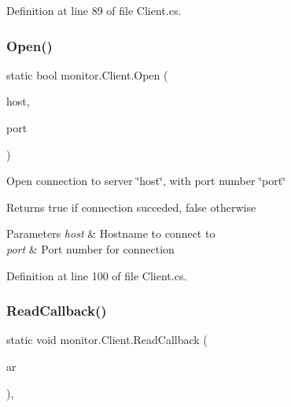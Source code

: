 Definition at line 89 of file Client.\+cs.

\mbox{\label{classmonitor_1_1_client_aee6f8f594a9496600b78c37d6da457d4}} 
\subsubsection{Open()\hspace{0.1cm}{\footnotesize\ttfamily [2/2]}}
{\footnotesize\ttfamily static bool monitor.\+Client.\+Open (\begin{DoxyParamCaption}\item[{string}]{host,  }\item[{int}]{port }\end{DoxyParamCaption})\hspace{0.3cm}{\ttfamily [static]}}



Open connection to server \char`\"{}host\char`\"{}, with port number \char`\"{}port\char`\"{} 

\begin{DoxyReturn}{Returns}
true if connection succeded, false otherwise
\end{DoxyReturn}

\begin{DoxyParams}{Parameters}
{\em host} & Hostname to connect to\\
\hline
{\em port} & Port number for connection\\
\hline
\end{DoxyParams}


Definition at line 100 of file Client.\+cs.

\mbox{\label{classmonitor_1_1_client_a8dd2eb26c164d0f566dd6c679ba340e0}} 
\subsubsection{Read\+Callback()}
{\footnotesize\ttfamily static void monitor.\+Client.\+Read\+Callback (\begin{DoxyParamCaption}\item[{I\+Async\+Result}]{ar }\end{DoxyParamCaption})\hspace{0.3cm}{\ttfamily [static]}, {\ttfamily [private]}}



